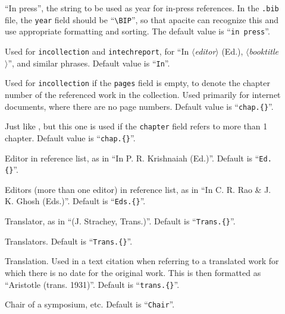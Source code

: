 \documentclass{article}
\newcommand{\pkg}[1]{\textsf{#1}}%
\newcommand{\fname}[1]{\texttt{#1}}%
\newcommand{\fieldname}[1]{\texttt{#1}}%
\newcommand{\entryname}[1]{\texttt{#1}}%
\newcommand{\cmd}[1]{\texttt{\string#1}}%
\newcommand{\opt}[1]{$\langle${\itshape #1}$\rangle$}%
\begin{document}
\begin{description}
  \item[\cmd{\BIP}] ``In press'', the string to be used as year for
      in-press references. In the \fname{.bib} file, the \fieldname{year}
      field should be ``\verb+\BIP+'', so that \pkg{apacite} can recognize
      this and use appropriate formatting and sorting.
      The default value is ``\verb+in press+''.

  \item[\cmd{\BIn}] Used for \entryname{incollection} and
      \entryname{intechreport}, for ``In \opt{editor} (Ed.{}),
      \opt{booktitle}'', and similar phrases. Default value is ``\verb+In+''.

  \item[\cmd{\BCHAP}] Used for \entryname{incollection} if the
      \fieldname{pages} field is empty, to denote the chapter number
      of the referenced work in the collection. Used primarily for
      internet documents, where there are no page numbers.
      Default value is ``\verb+chap.{}+''.

  \item[\cmd{\BCHAPS}] Just like \cmd{\BCHAP}, but this one is used
      if the \fieldname{chapter} field refers to more than 1 chapter.
      Default value is ``\verb+chap.{}+''.

  \item[\cmd{\BED}] Editor in reference list, as in
      ``In P. R. Krishnaiah (Ed.{})''. Default is ``\verb+Ed.{}+''.

  \item[\cmd{\BEDS}] Editors (more than one editor) in reference list,
      as in ``In C. R. Rao \& J. K. Ghosh (Eds.{})''.
      Default is ``\verb+Eds.{}+''.

  \item[\cmd{\BTRANS}] Translator, as in ``(J. Strachey, Trans.{})''.
      Default is ``\verb+Trans.{}+''.

  \item[\cmd{\BTRANSS}] Translators. Default is ``\verb+Trans.{}+''.

  \item[\cmd{\BTRANSL}] Translation. Used in a text citation when
      referring to a translated work for which there is no date
      for the original work. This is then formatted as
      ``Aristotle (trans.{} 1931)''. Default is ``\verb+trans.{}+''.

  \item[\cmd{\BCHAIR}] Chair of a symposium, etc.
      Default is ``\verb+Chair+''.


\end{description}
\end{document}
